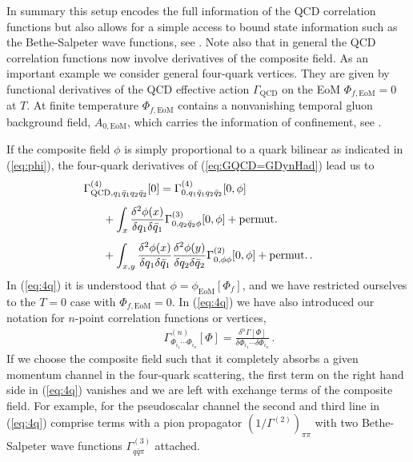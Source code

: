\documentclass[%
reprint,
superscriptaddress,
showpacs,preprintnumbers,
 amsmath,amssymb,
 aps,
prd,
]{revtex4-1}
\def\eq#1{(\ref{#1})}
\def\0#1#2{\frac{#1}{#2}}
\begin{document}
In summary this setup encodes the full information of the QCD
correlation functions but also allows for a simple access to bound
state information such as the Bethe-Salpeter wave functions, see
\cite{Mitter:2014wpa, Braun:2014ata, Cyrol:2017qkl, Alkofer:2018guy}.
Note also that in general the QCD correlation functions now involve
derivatives of the composite field. As an important example we
consider general four-quark vertices. They are given by functional
derivatives of the QCD effective action $\Gamma_{\textrm{QCD}}$ on the
EoM $\Phi_{f,\textrm{EoM}}=0$ at $T$. At finite temperature
$\Phi_{f,\textrm{EoM}}$ contains a nonvanishing temporal gluon
background field, $A_{0,\textrm{EoM}}$, which carries the information
of confinement, see \cite{Braun:2007bx, Braun:2010cy, Fister:2013bh,
  Herbst:2015ona}.

If the composite field $\phi$ is simply
proportional to a quark bilinear as indicated in \eq{eq:phi}, the
four-quark derivatives of \eq{eq:GQCD=GDynHad} lead us to
% 
  \begin{align}\nonumber 
   & \hspace{-.6cm}\Gamma^{(4)}_{\textrm{QCD}, q_1 \bar q_1 q_2\bar q_2}[0] =
    \Gamma^{(4)}_{0, q_1 \bar q_1 q_2\bar q_2}[0,
    \phi]\\[1ex]\nonumber 
    &+
  \int_x \frac{\delta^2\phi(x)}{\delta q_1 \delta \bar q_1 }
      \Gamma^{(3)}_{0, q_2 \bar q_2\phi}[0,\phi]+
      \textrm{permut.}\\[1ex]
    & +
    \int_{x,y} \frac{\delta^2\phi(x)}{\delta q_1 \delta \bar q_1 }
    \frac{\delta^2\phi(y)}{\delta q_2 \delta \bar q_2 }
    \Gamma^{(2)}_{0, \phi\phi}[0,\phi]+\textrm{permut.}\,.
 \label{eq:4q} \end{align}
%
In \eq{eq:4q} it is understood that $\phi=\phi_\textrm{EoM}[\Phi_f]$,
and we have restricted ourselves to the $T=0$ case with 
$\Phi_{f,\textrm{EoM}}=0$. In \eq{eq:4q} we have also introduced our
notation for $n$-point correlation functions or vertices,
%
\begin{align}\label{eq:Gn}
  \qquad \Gamma^{(n)}_{\Phi_{i_1}\cdots \Phi_{i_n}}[\Phi]=
  \0{\delta^n\Gamma[\Phi]}{\delta\Phi_{i_1}
  \cdots\delta\Phi_{i_n}}\,. 
\end{align}
If we choose the composite field such that it completely absorbs a
given momentum channel in the four-quark scattering, the first term on
the right hand side in \eq{eq:4q} vanishes and we are left with
exchange terms of the composite field. For example, for the
pseudoscalar channel the second and third line in \eq{eq:4q} comprise
terms with a pion propagator $(1/\Gamma^{(2)})_{\pi\pi}$ with two
Bethe-Salpeter wave functions $\Gamma^{(3)}_{q\bar q\pi}$ attached.
\end{document}
